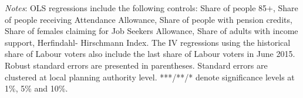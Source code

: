 \documentclass[12pt,letterpaper]{article}
\begin{document}
\begin{table}[h]
{\begin{tabular}{@{}lcccccc@{}}
\end{tabular}}
\begin{tablenotes}
      \scriptsize
      \item {\it{Notes}}:  OLS regressions include the following controls:
       Share of people 85+, Share of people receiving Attendance Allowance,
        Share of people with pension credits, Share of females claiming for Job Seekers Allowance, 
        Share of adults with income support, Herfindahl- Hirschmann Index. 
        The IV regressions using the historical share of Labour voters also include the last share of Labour 
        voters in June 2015. Robust standard errors are presented in parentheses. Standard errors are clustered 
        at local planning authority level. ***/**/* denote significance levels at 1\%, 5\% and 10\%.
    \end{tablenotes}
\end{table}


\newpage
\end{document}

